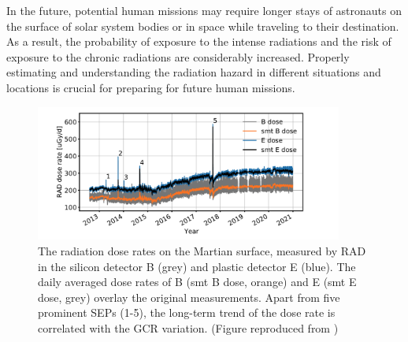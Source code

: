 In the future, potential human missions may require longer stays of astronauts on the surface of solar system bodies or in space while traveling to their destination. As a result, the probability of exposure to the intense radiations and the risk of exposure to the chronic radiations are considerably increased. Properly estimating and understanding the radiation hazard in different situations and locations is crucial for preparing for future human missions.







\begin{figure}
	\centering
	\includegraphics[width = 0.9\textwidth]{images/Rad_GCR_radiation.png}
	\caption[The long term radiation dose rates on the Martian surface]{The radiation dose rates on the Martian surface, measured by \ac{RAD} in the silicon detector B (grey) and plastic detector E (blue). The daily averaged dose rates of B (smt B dose, orange) and E (smt E dose, grey) overlay the original measurements. Apart from five prominent \acp{SEP} (1-5), the long-term trend of the dose rate is correlated with the \ac{GCR} variation. (Figure reproduced from \citep{Guo2021AARv_rad})}
	\label{Fig:Rad_GCR_radiation}
\end{figure}


